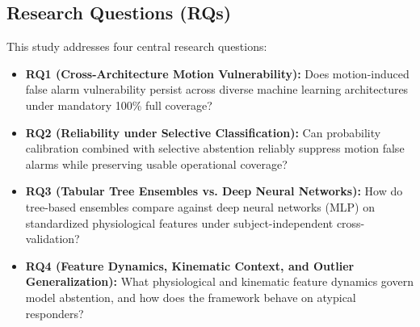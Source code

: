 \documentclass[conference]{IEEEtran}
\begin{document}
\subsection{Research Questions (RQs)}
This study addresses four central research questions:
\begin{itemize}
    \item \textbf{RQ1 (Cross-Architecture Motion Vulnerability):} Does motion-induced false alarm vulnerability persist across diverse machine learning architectures under mandatory 100\% full coverage?
    \item \textbf{RQ2 (Reliability under Selective Classification):} Can probability calibration combined with selective abstention reliably suppress motion false alarms while preserving usable operational coverage?
    \item \textbf{RQ3 (Tabular Tree Ensembles vs. Deep Neural Networks):} How do tree-based ensembles compare against deep neural networks (MLP) on standardized physiological features under subject-independent cross-validation?
    \item \textbf{RQ4 (Feature Dynamics, Kinematic Context, and Outlier Generalization):} What physiological and kinematic feature dynamics govern model abstention, and how does the framework behave on atypical responders?
\end{itemize}
\end{document}
